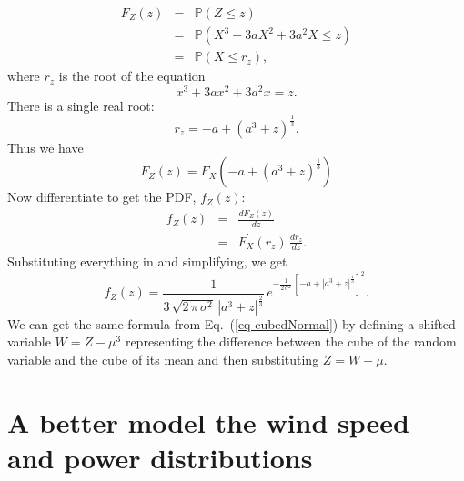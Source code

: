 \documentclass[11pt]{article}
\newcommand{\dd}[2]{\frac{d {#1}}{d {#2}}}
\begin{document}
\begin{multicols}{2}
 \begin{eqnarray*}
F_Z(z) &=& \mathbb{P}(Z \leq z)\\
&=& \mathbb{P}(X^3 + 3 a X^2 + 3a^2 X \leq z)\\
&=& \mathbb{P}(X \leq r_z),
\end{eqnarray*}
where $r_z$ is the root of the equation
\begin{equation}
x^3 + 3 a x^2 + 3a^2 x = z. 
\end{equation}
There is a single real root:
\begin{equation}
r_z = -a + (a^3 + z)^\frac{1}{3}.
\end{equation}
Thus we have 
\begin{equation}
F_Z(z) = F_X( -a + (a^3 + z)^\frac{1}{3})
\end{equation}
Now differentiate to get the PDF, $f_Z(z)$:
\begin{eqnarray*}
f_Z(z) &=& \dd{F_Z(z)}{z}\\
&=& F_X^\prime( r_z ) \, \dd{r_z }{z}.
\end{eqnarray*}
Substituting everything in and simplifying, we get
\begin{equation}
\label{eq-powerError}
f_Z(z) = \frac{1}{3\,\sqrt{2\,\pi\,\sigma^2}\,\left| a^3 + z \right|^\frac{2}{3}} \, e^{- \frac{1}{2\,\sigma^2}\,\left[-a +  \left|a^3 + z\right|^\frac{1}{3}\right]^2}.
\end{equation}
We can get the same formula from Eq.~(\ref{eq-cubedNormal}) by defining a shifted variable $W = Z - \mu^3$ representing the difference between the cube of the random variable and the cube of its mean and then substituting $Z = W + \mu$. 

 \section{A better model the wind speed and power distributions}
 

\end{multicols}
\end{document}
